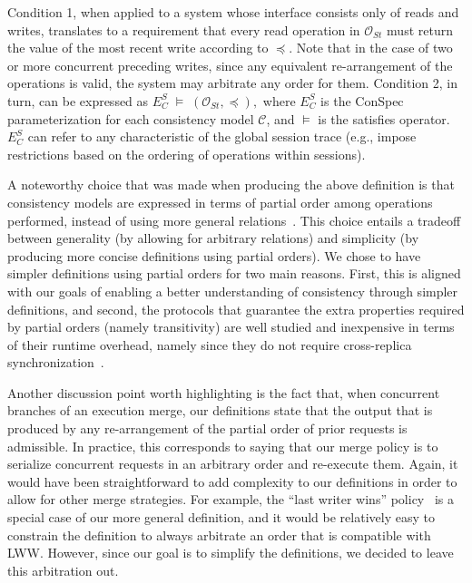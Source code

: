 \documentclass[journal,compsoc]{IEEEtran}
\begin{document}
Condition 1, when applied to a system whose interface consists only of reads and writes, translates to a requirement that every read operation in %
${\mathcal{O}_{St}}$ must return the value of the most recent write according to $\preccurlyeq$. Note that in the case of two or more concurrent preceding writes, since any  equivalent re-arrangement of the operations is valid, the system may arbitrate any order for them.
  Condition 2, in turn, can be expressed as $ E^S_C\; \vDash \; \left( {\mathcal{O}_{St}}, \preccurlyeq \right),$ where %
  $E^S_C$ is the ConSpec parameterization for each
 consistency model $\mathcal{C}$,
 and  $\vDash$ is the satisfies operator. $E^S_C$  can refer to any characteristic of the global session trace (e.g., impose restrictions based on the ordering of operations within sessions).
 \par A noteworthy choice that was made when producing the above definition is that consistency models are expressed in terms of  partial order among operations performed, instead of using more general relations~\cite{Burckhardt:2014:PEC:2693641.2693642}. This choice entails a tradeoff between generality (by allowing for arbitrary relations) and simplicity (by producing more concise definitions using partial orders). We chose to have simpler definitions using partial orders for two main reasons. First, this is aligned with our goals of enabling a better understanding of consistency through simpler definitions, and second, the protocols that guarantee the extra properties required by partial orders (namely transitivity) are well studied and inexpensive in terms of their runtime overhead, namely since they do not require cross-replica synchronization~\cite{Bailis:2013:BCC:2463676.2465279,Lloyd:2011:DSE:2043556.2043593}.

 Another discussion point worth highlighting is the fact that, when concurrent branches of an execution merge, our definitions state that the output that is produced by any re-arrangement of the partial order of prior requests is admissible. In practice, this corresponds to saying that our merge policy is to serialize concurrent requests in an arbitrary order and re-execute them. Again, it would have been straightforward to add complexity to our definitions in order to allow for other merge strategies.
For example, the ``last writer wins'' policy~\cite{lww} is a special case of our more general definition, and it would be relatively easy to constrain the definition to always arbitrate an order that is compatible with LWW. However, since our goal is to simplify the definitions, we decided to leave this arbitration out.
\end{document}
